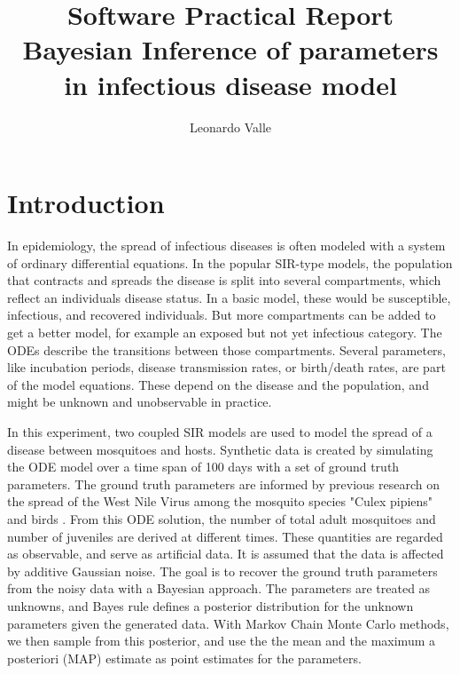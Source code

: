 \documentclass{article}
\begin{document}
\title{Software Practical Report\\\large Bayesian Inference of parameters in infectious disease model}
\author{Leonardo Valle}
%

%
\maketitle              %
%

\newpage

\tableofcontents
\section{Introduction}
In epidemiology, the spread of infectious diseases is often modeled with a system of 
ordinary differential equations. 
In the popular SIR-type models, the population that contracts and spreads the disease is 
split into several compartments, which reflect an individuals disease status. In a basic 
model, these would be susceptible, infectious, and recovered individuals. But more compartments 
can be added to get a better model, for example an exposed but not yet infectious category. 
The ODEs describe the transitions between those compartments. Several parameters, like 
incubation periods, disease transmission rates, or birth/death rates, are part of the model 
equations. These depend on the disease and the population, and might be unknown and unobservable 
in practice. 

In this experiment, two coupled SIR models are used to model the spread of a disease between 
mosquitoes and hosts. Synthetic data is created by simulating the ODE model over a time span
of 100 days with a set of ground truth parameters. The ground truth parameters are informed by 
previous research on the spread of the West Nile Virus among the mosquito species "Culex pipiens" 
and birds \cite{Heidecke2024.09.16.613097} \cite{Vogels2017-li}. 
From this ODE solution, the number of total adult mosquitoes and number of juveniles are derived at 
different times. These quantities are regarded as observable, and serve as artificial data.
It is assumed that the data is affected by additive Gaussian noise. The goal is to recover
the ground truth parameters from the noisy data with a Bayesian approach. The parameters are treated 
as unknowns, and Bayes rule defines a posterior distribution for the unknown parameters given the 
generated data. With Markov Chain Monte Carlo methods, we then sample from this posterior, and use the
the mean and the maximum a posteriori (MAP) estimate as point estimates for the parameters. 
\end{document}
